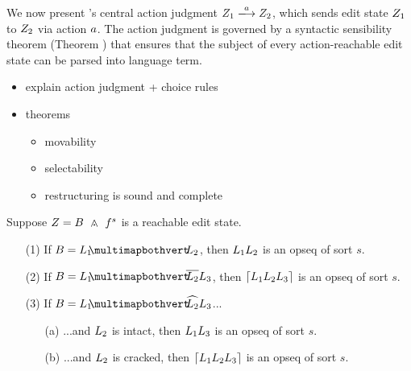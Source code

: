 
We now present \ty's central action judgment
$\performAction{\editState_1}{\action}{\editState_2}$,
which sends edit state $Z_1$ to $Z_2$
via action $a$.
The action judgment is governed by a syntactic sensibility
theorem (Theorem ) that ensures that
the subject of every action-reachable edit state can
be parsed into language term.












\begin{itemize}
  \item explain action judgment + choice rules
  \item theorems
  \begin{itemize}
    \item movability
    \item selectability
    \item restructuring is sound and complete
  \end{itemize}
\end{itemize}

\begin{theorem}
  Suppose $Z = \zipper{\subject}{\tfrelem^s}$ is a reachable edit state.
  \begin{enumerate}
  \item[(1)] If $\subject = \pointing{\selection_1}{\selection_2}$,
    then $L_1L_2$ is an opseq of sort $s$.
  \item[(2)] If $\subject = \selecting{\selection_1}{\selection_2}{\selection_3}$,
    then $\left\lceil L_1L_2L_3\right\rceil$ is an opseq of sort $s$.
  \item[(3)] If $\subject = \restructuring{\selection_1}{\selection_2}{\selection_3}$...
    \begin{enumerate}
      \item[(a)] ...and $L_2$ is intact, then
        $L_1L_3$ is an opseq of sort $s$.
      \item[(b)] ...and $L_2$ is cracked, then
        $\left\lceil L_1L_2L_3\right\rceil$ is an opseq of sort $s$.
    \end{enumerate}
  \end{enumerate}
\end{theorem}

